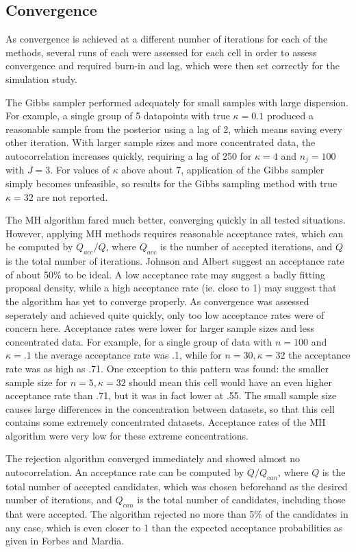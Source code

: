 \documentclass[]{gSCS2e}
\theoremstyle{plain}
\theoremstyle{definition}
\theoremstyle{remark}
\begin{document}
\subsection{Convergence} \label{convergence}

As convergence is achieved at a different number of iterations for each of the methods, several runs of each were assessed for each cell in order to assess convergence and required burn-in and lag, which were then set correctly for the simulation study. 

The Gibbs sampler performed adequately for small samples with large dispersion. For example, a single group of 5 datapoints with true $\kappa = 0.1$ produced a reasonable sample from the posterior using a lag of 2, which means saving every other iteration. With larger sample sizes and more concentrated data, the autocorrelation increases quickly, requiring a lag of 250 for $\kappa = 4$ and $n_j = 100$ with $J=3$. For values of $\kappa$ above about 7, application of the Gibbs sampler simply becomes unfeasible, so results for the Gibbs sampling method with true $\kappa=32$ are not reported. 

The MH algorithm fared much better, converging quickly in all tested situations. However, applying MH methods requires reasonable acceptance rates, which can be computed by $Q_{acc}/Q$, where $Q_{acc}$ is the number of accepted iterations, and $Q$ is the total number of iterations. Johnson and Albert \cite{johnson1999ordinal} suggest an acceptance rate of about 50\% to be ideal. A low acceptance rate may suggest a badly fitting proposal density, while a high acceptance rate (ie. close to 1) may suggest that the algorithm has yet to converge properly. As convergence was assessed seperately and achieved quite quickly, only too low acceptance rates were of concern here. Acceptance rates were lower for larger sample sizes and less concentrated data. For example, for a single group of data with $n=100$ and $ \kappa=.1$ the average acceptance rate was .1, while for $n=30, \kappa=32$ the acceptance rate was as high as .71. One exception to this pattern was found: the smaller sample size for $n=5, \kappa=32$ should mean this cell would have an even higher acceptance rate than .71, but it was in fact lower at .55. The small sample size causes large differences in the concentration between datasets, so that this cell contains some extremely concentrated datasets. Acceptance rates of the MH algorithm were very low for these extreme concentrations. 

The rejection algorithm converged immediately and showed almost no autocorrelation. An acceptance rate can be computed by $Q/Q_{can}$, where $Q$ is the total number of accepted candidates, which was chosen beforehand as the desired number of iterations, and $Q_{can}$ is the total number of candidates, including those that were accepted. The algorithm rejected no more than 5\% of the candidates in any case, which is even closer to 1 than the expected acceptance probabilities as given in Forbes and Mardia.\cite{forbes2014fast}
\end{document}
